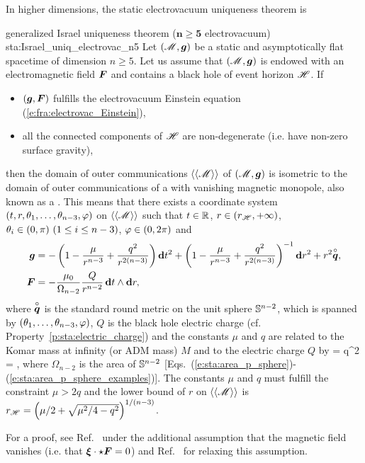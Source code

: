 In higher dimensions, the static electrovacuum uniqueness theorem is

\begin{tprop}{generalized Israel uniqueness theorem ($\bm{n\geq 5}$ electrovacuum)
}{sta:Israel_uniq_electrovac_n5}
Let $(\mathscr{M},\bm{g})$ be a static and asymptotically flat spacetime of dimension $n\geq 5$.
Let us assume that $(\mathscr{M},\bm{g})$ is
endowed with an electromagnetic field $\bm{F}$ and
contains a black hole of event horizon $\mathscr{H}$. If
\begin{itemize}
\item $(\bm{g},\bm{F})$ fulfills the electrovacuum Einstein equation (\ref{e:fra:electrovac_Einstein}),
\item all the connected components of $\mathscr{H}$ are non-degenerate
(i.e. have non-zero surface gravity),
\end{itemize}
then the domain of outer communications $\langle\langle \mathscr{M}\rangle\rangle$ of $(\mathscr{M},\bm{g})$ is isometric
to the domain of outer communications of a
 with vanishing magnetic monopole, also known as a
.
This means that there exists a coordinate system
$(t,r,\theta_1,\ldots,\theta_{n-3},\varphi)$ on $\langle\langle \mathscr{M}\rangle\rangle$ such that
$t\in\mathbb{R}$, $r\in (r_{\mathscr{H}},+\infty)$, $\theta_i \in (0,\pi)\ (1\leq i \leq n-3)$,
$\varphi\in (0, 2\pi)$ and
\begin{subequations}
\label{e:sta:ReiNorTang}
\begin{align}
    \bm{g} & = - \left( 1 - \frac{\mu}{r^{n-3}} + \frac{q^2}{r^{2(n-3)}} \right) \mathbf{d} t^2
    +  \left( 1 - \frac{\mu}{r^{n-3}} + \frac{q^2}{r^{2(n-3)}}  \right) ^{-1} \mathbf{d} r^2
    + r^2 \overset{\circ}{\bm{q}}, \\
    \bm{F} & = - \frac{\mu_0}{\Omega_{n-2}} \frac{Q}{r^{n-2}} \,  \mathbf{d} t \wedge \mathbf{d} r ,
\end{align}
\end{subequations}
where $\overset{\circ}{\bm{q}}$ is the standard round metric on
the unit sphere $\mathbb{S}^{n-2}$, which is
spanned by $(\theta_1,\ldots,\theta_{n-3},\varphi)$,
$Q$ is the black hole electric charge (cf. Property~\ref{p:sta:electric_charge}) and
the constants $\mu$ and $q$ are related to the Komar mass at infinity (or ADM mass)
$M$ and to the electric charge $Q$ by
\be \label{e:sta:ReiNorTang_mu_q}
    \mu = 
    \qand
    q^2 =  ,
\ee
where $\Omega_{n-2}$ is the area of $\mathbb{S}^{n-2}$
[Eqs.~(\ref{e:sta:area_p_sphere})-(\ref{e:sta:area_p_sphere_examples})].
The constants $\mu$ and $q$ must fulfill the constraint $\mu > 2 q$ and the lower bound
of $r$ on $\langle\langle \mathscr{M}\rangle\rangle$ is
$r_{\mathscr{H}} = \left( \mu/2 + \sqrt{\mu^2/4 - q^2}\right) ^{1/(n-3)}$.
\end{tprop}
For a proof, see Ref.~\cite{GibboIS02a} under the additional assumption
that the magnetic field vanishes (i.e. that $\bm{\xi}\cdot\star\bm{F}=0$) and Ref.~\cite{KunduL18} for relaxing this assumption.

